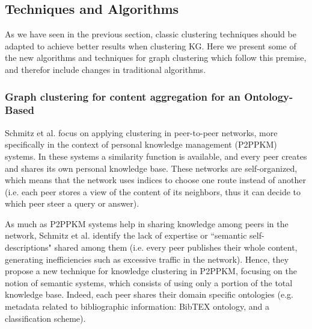 \documentclass[runningheads]{llncs}
\begin{document}
\subsection{Techniques and Algorithms}\label{algorithms}
As we have seen in the previous section, classic clustering techniques should be adapted to achieve better results when clustering KG. Here we present some of the new algorithms and techniques for graph clustering which follow this premise, and therefor include changes in traditional algorithms.

\subsubsection{Graph clustering for content aggregation for an Ontology-Based}\label{content-aggregation}
Schmitz et al. \cite{Schmitz} focus on applying clustering in peer-to-peer networks, more specifically in the context of personal knowledge management (P2PPKM) systems. In these systems a similarity function is available, and every peer creates and shares its own personal knowledge base. These networks are self-organized, which means that the network uses indices to choose one route instead of another (i.e. each peer stores a view of the content of its neighbors, thus it can decide to which peer steer a query or answer).

As much as P2PPKM systems help in sharing knowledge among peers in the network, Schmitz et al. \cite{Schmitz} identify the lack of expertise or ``semantic self-descriptions" shared among them (i.e. every peer publishes their whole content, generating inefficiencies such as excessive traffic in the network). Hence, they propose a new technique for knowledge clustering in P2PPKM, focusing on the notion of semantic systems, which consists of using only a portion of the total knowledge base. Indeed, each peer shares their domain specific ontologies (e.g. metadata related to bibliographic information: BibTEX ontology, and a classification scheme). 
\end{document}

